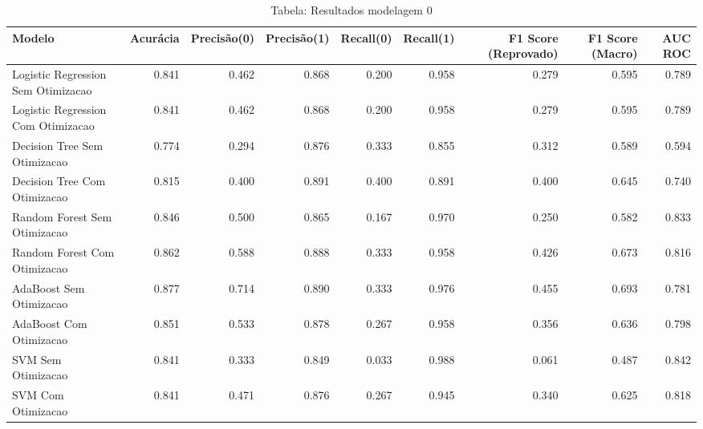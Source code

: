\begin{table}[H] %
    \centering
    \caption{Tabela: Resultados modelagem 0}
    \label{tab:resultados_modelagem_0}
    \renewcommand{\arraystretch}{1.25} %
    \begin{adjustwidth}{ -1in }{ -1in } %
    \centering %
    \small %
    \begin{tabular}{lrrrrrrrr}
\toprule
                            Modelo &  Acurácia &  Precisão(0) &  Precisão(1) &  Recall(0) &  Recall(1) &  F1 Score (Reprovado) &  F1 Score (Macro) &  AUC ROC \\
\midrule
Logistic Regression Sem Otimizacao &     0.841 &        0.462 &        0.868 &      0.200 &      0.958 &                 0.279 &             0.595 &    0.789 \\
Logistic Regression Com Otimizacao &     0.841 &        0.462 &        0.868 &      0.200 &      0.958 &                 0.279 &             0.595 &    0.789 \\
      Decision Tree Sem Otimizacao &     0.774 &        0.294 &        0.876 &      0.333 &      0.855 &                 0.312 &             0.589 &    0.594 \\
      Decision Tree Com Otimizacao &     0.815 &        0.400 &        0.891 &      0.400 &      0.891 &                 0.400 &             0.645 &    0.740 \\
      Random Forest Sem Otimizacao &     0.846 &        0.500 &        0.865 &      0.167 &      0.970 &                 0.250 &             0.582 &    0.833 \\
      Random Forest Com Otimizacao &     0.862 &        0.588 &        0.888 &      0.333 &      0.958 &                 0.426 &             0.673 &    0.816 \\
           AdaBoost Sem Otimizacao &     0.877 &        0.714 &        0.890 &      0.333 &      0.976 &                 0.455 &             0.693 &    0.781 \\
           AdaBoost Com Otimizacao &     0.851 &        0.533 &        0.878 &      0.267 &      0.958 &                 0.356 &             0.636 &    0.798 \\
                SVM Sem Otimizacao &     0.841 &        0.333 &        0.849 &      0.033 &      0.988 &                 0.061 &             0.487 &    0.842 \\
                SVM Com Otimizacao &     0.841 &        0.471 &        0.876 &      0.267 &      0.945 &                 0.340 &             0.625 &    0.818 \\
\bottomrule
\end{tabular}
    \end{adjustwidth}
    \renewcommand{\arraystretch}{1.0} %
\end{table}
